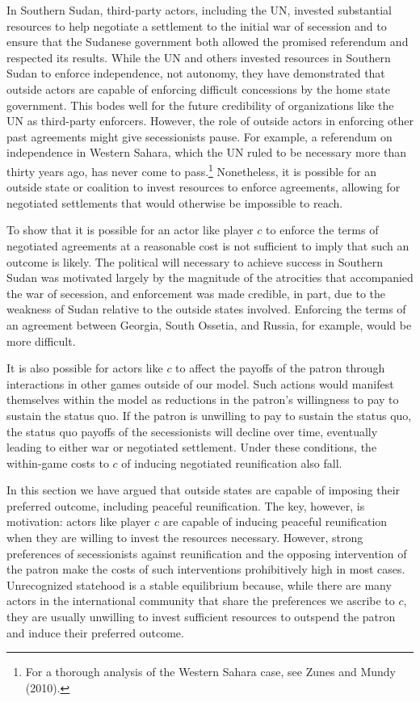 \documentclass[11pt,letterpaper, notitlepage]{article}
\begin{document}
In Southern Sudan, third-party actors, including the UN, invested substantial resources to help negotiate a settlement to the initial war of secession and to ensure that the Sudanese government both allowed the promised referendum and respected its results. While the UN and others invested resources in Southern Sudan to enforce independence, not autonomy, they have demonstrated that outside actors are capable of enforcing difficult concessions by the home state government. This bodes well for the future credibility of organizations like the UN as third-party enforcers. However, the role of outside actors in enforcing other past agreements might give secessionists pause. For example, a referendum on independence in Western Sahara, which the UN ruled to be necessary more than thirty years ago, has never come to pass.\footnote{For a thorough analysis of the Western Sahara case, see Zunes and Mundy (2010).} Nonetheless, it is possible for an outside state or coalition to invest resources to enforce agreements, allowing for negotiated settlements that would otherwise be impossible to reach.

To show that it is possible for an actor like player $c$ to enforce the terms of negotiated agreements at a reasonable cost is not sufficient to imply that such an outcome is likely. The political will necessary to achieve success in Southern Sudan was motivated largely by the magnitude of the atrocities that accompanied the war of secession, and enforcement was made credible, in part, due to the weakness of Sudan relative to the outside states involved. Enforcing the terms of an agreement between Georgia, South Ossetia, and Russia, for example, would be more difficult.

It is also possible for actors like $c$ to affect the payoffs of the patron through interactions in other games outside of our model. Such actions would manifest themselves within the model as reductions in the patron's willingness to pay to sustain the status quo. If the patron is unwilling to pay to sustain the status quo, the status quo payoffs of the secessionists will decline over time, eventually leading to either war or negotiated settlement. Under these conditions, the within-game costs to $c$ of inducing negotiated reunification also fall.

In this section we have argued that outside states are capable of imposing their preferred outcome, including peaceful reunification. The key, however, is motivation: actors like player $c$ are capable of inducing peaceful reunification when they are willing to invest the resources necessary. However, strong preferences of secessionists against reunification and the opposing intervention of the patron make the costs of such interventions prohibitively high in most cases. Unrecognized statehood is a stable equilibrium because, while there are many actors in the international community that share the preferences we ascribe to $c$, they are usually unwilling to invest sufficient resources to outspend the patron and induce their preferred outcome.
\end{document}
